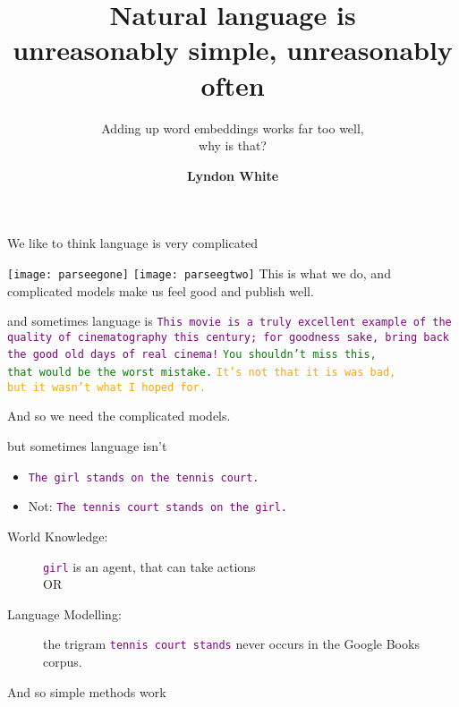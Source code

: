 \documentclass[dvipsnames]{beamer}
\institute{Department of Electical, Electronic and Computer Engineering\\The University of Western Australia}
\date{}
\title{Natural language is \\ unreasonably simple, unreasonably often}
\subtitle{Adding up word embeddings works far too well,\\ why is that?}
\author{
	\textbf{Lyndon White}}
\let\oldnote\note
\renewcommand{\note}{\oldnote[item]}
\renewcommand{\emph}{\alert}
\newcommand{\countertitle}[1]{\vfill\vfill{\centering \Large \color{bluewrite} #1}\vspace{-0.5cm}}
\newcommand{\natlang}[1]{\textcolor{Purple}{\texttt{#1}}}
\begin{document}
\centering %
\frame{\maketitle}
\logo{}

%

\begin{frame}{We like to think language is very complicated}
	
	\texttt{[image: parseegone]}
	\vfill
	\texttt{[image: parseegtwo]}
	\vfill	
	\vfill	
	\countertitle{This is what we do, and complicated models make us feel good and publish well.}
\end{frame}

\begin{frame}{and sometimes language is}
	\vfill
	\natlang{This movie is a truly excellent example of the quality of cinematography this century; for goodness sake, bring back the good old days of real cinema!}
	\vfill
	\natlang{\textcolor{Green}{You shouldn't miss this,\\ that would be the worst mistake.}}
	\vfill
	\natlang{\textcolor{Orange}{It's not that it is was bad,\\ but it wasn't what I hoped for.}}
	
	\countertitle{And so we need the complicated models.}
	\vfill
\end{frame}

\begin{frame}{but sometimes language isn't}
	\begin{itemize}
		\item \natlang{The girl stands on the tennis court.}
		\item Not: \natlang{The tennis court stands on the girl.}
	\end{itemize}
	\vfill
	\pause
	\begin{description}
		\item[World Knowledge:] \natlang{girl} is an \emph{agent}, that can take \emph{actions}%
		\\
		\hfill OR\hfill\hfill\hfill\null
		\pause
		\item[Language Modelling:] the trigram \natlang{tennis court stands} never occurs in the Google Books corpus.
	\end{description}
	\countertitle{And so simple methods work}
\end{frame}
\end{document}
